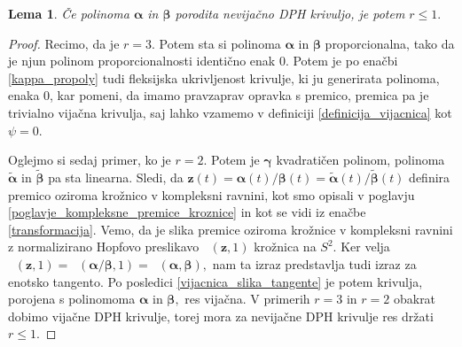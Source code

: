 \documentclass[12pt,a4paper,twoside]{article}
\theoremstyle{definition} %
\theoremstyle{plain} %
\newtheorem{lema}[definicija]{Lema}
\theoremstyle{primerstyle}
\numberwithin{equation}{section}  %
\newcommand{\zV}{\mathbf{z}}
\newcommand{\balpha}{\boldsymbol \alpha}
\newcommand{\bbeta}{\boldsymbol \beta}
\newcommand{\bgamma}{\boldsymbol \gamma}
\newcommand{\btalpha}{\tilde{\boldsymbol \alpha}}
\newcommand{\btbeta}{\tilde{\boldsymbol \beta}}
\DeclareMathOperator{\nhopf}{\hat{H}}
\begin{document}
\begin{lema}
	\label{lema_1}
	Če polinoma $\balpha$ in $\bbeta$ porodita nevijačno DPH krivuljo, je potem $r \leq 1.$
\end{lema}
\begin{proof}
	Recimo, da je $r=3.$ Potem sta si polinoma $\balpha$ in $\bbeta$ proporcionalna, tako da je njun polinom proporcionalnosti identično enak 0. Potem je po enačbi \eqref{kappa_propoly} tudi fleksijska ukrivljenost krivulje, ki ju generirata polinoma, enaka 0, kar pomeni, da imamo pravzaprav opravka s premico, premica pa je trivialno vijačna krivulja, saj lahko vzamemo v definiciji \ref{definicija_vijacnica} kot $\psi=0.$
	
	Oglejmo si sedaj primer, ko je $r=2.$ Potem je $\bgamma$ kvadratičen polinom, polinoma $\btalpha$ in $\btbeta$ pa sta linearna. Sledi, da $\zV(t)=\balpha(t)/\bbeta(t)=\btalpha(t)/\btbeta(t)$ definira premico oziroma krožnico v kompleksni ravnini, kot smo opisali v poglavju \ref{poglavje_kompleksne_premice_kroznice} in kot se vidi iz enačbe \eqref{transformacija}. Vemo, da je slika premice oziroma krožnice v kompleksni ravnini z normalizirano Hopfovo preslikavo $\nhopf(\zV,1)$ krožnica na $S^2.$ Ker velja $\nhopf(\zV,1)=\nhopf(\balpha/\bbeta,1)=\nhopf(\balpha,\bbeta),$ nam ta izraz predstavlja tudi izraz za enotsko tangento. Po posledici \ref{vijacnica_slika_tangente} je potem krivulja, porojena s polinomoma $\balpha$ in $\bbeta,$ res vijačna. V primerih $r=3$ in $r=2$ obakrat dobimo vijačne DPH krivulje, torej mora za nevijačne DPH krivulje res držati $r \leq 1.$
\end{proof}
\end{document}
